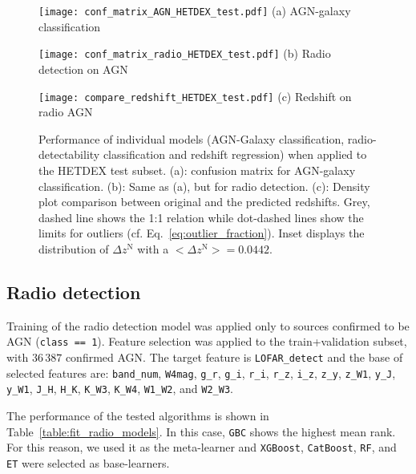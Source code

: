 \documentclass{aa}
\begin{document}
\begin{figure}
  \centering
  \begin{minipage}{0.49\columnwidth}
    \centering
    \texttt{[image: conf\_matrix\_AGN\_HETDEX\_test.pdf]}\hfill\break
    {(a) AGN-galaxy classification}
  \end{minipage}%
  \begin{minipage}{0.49\columnwidth}
    \centering
    \texttt{[image: conf\_matrix\_radio\_HETDEX\_test.pdf]}\hfill\break
    {(b) Radio detection on AGN}
  \end{minipage}\hfill\break%
  \begin{minipage}{0.70\columnwidth}
    \centering
    \texttt{[image: compare\_redshift\_HETDEX\_test.pdf]}\hfill\break
    {(c) Redshift on radio AGN}
  \end{minipage}%
  \caption{Performance of individual models (AGN-Galaxy classification, radio-detectability classification and redshift regression) when applied to the HETDEX test subset. (a): confusion matrix for AGN-galaxy classification. 
  (b): Same as (a), but for radio detection. (c): Density plot comparison between original and the predicted redshifts. 
  Grey, dashed line shows the 1:1 relation while dot-dashed lines show the limits for outliers (cf. Eq.~\ref{eq:outlier_fraction}). Inset displays the distribution of $\Delta z^{\mathrm{N}}$ with a ${{<}\Delta z^{\mathrm{N}}{>} = 0.0442}$.}
  \label{fig:results_models_test}
\end{figure}

\subsection{Radio detection}\label{sec:results_radio}

Training of the radio detection model was applied only to sources confirmed to be AGN (\texttt{class == 1}).
Feature selection was applied to the train+validation subset, with $36\,387$ confirmed AGN. 
The target feature is \verb|LOFAR_detect| and the base of selected features are:  \verb|band_num|, \verb|W4mag|, \verb|g_r|, \verb|g_i|, \verb|r_i|, \verb|r_z|, \verb|i_z|, \verb|z_y|, \verb|z_W1|, \verb|y_J|, \verb|y_W1|, \verb|J_H|, \verb|H_K|, \verb|K_W3|, \verb|K_W4|, \verb|W1_W2|, and \verb|W2_W3|.

The performance of the tested algorithms is shown in Table~\ref{table:fit_radio_models}. 
In this case, \verb|GBC| shows the highest mean rank. For this reason, we used it as the meta-learner and \verb|XGBoost|, \verb|CatBoost|, \verb|RF|, and \verb|ET| were selected as base-learners.
\end{document}
